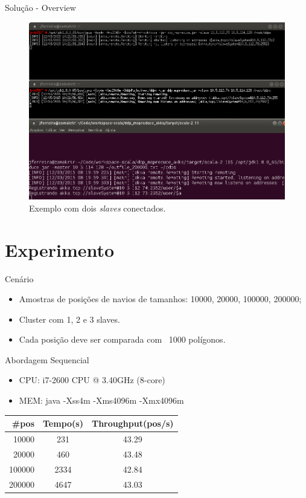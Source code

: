 \documentclass{beamer}
\begin{document}
		\begin{frame}{Solução - Overview}
			\begin{figure}[H]
				\includegraphics[scale=0.23]{img/screen_mapreduce.png}
				\caption{Exemplo com dois \textit{slaves} conectados.}
				\label{fig:screen_mapreduce}
			\end{figure}
		\end{frame}

\section{Experimento}
	\begin{frame}{Cenário}
		\begin{itemize}
			\item Amostras de posições de navios de tamanhos: 10000, 20000, 100000, 200000;
			\item Cluster com 1, 2 e 3 slaves.
			\item Cada posição deve ser comparada com ~1000 polígonos.
		\end{itemize}
	\end{frame}

	\begin{frame}{Abordagem Sequencial}
		\begin{itemize}
			\item CPU: i7-2600 CPU @ 3.40GHz (8-core)
			\item MEM: java -Xss4m -Xms4096m -Xmx4096m
		\end{itemize}

		\begin{tabular}{| r | c | c |}
		  \hline
		  \#pos & Tempo(s) & Throughput(pos/s) \\
		  \hline			
		 10000 & 231 & 43.29 \\
		 20000 & 460 & 43.48 \\
		 100000 & 2334 & 42.84 \\
		 200000 & 4647 & 43.03 \\
		  \hline  
		\end{tabular}
	\end{frame}
\end{document}
